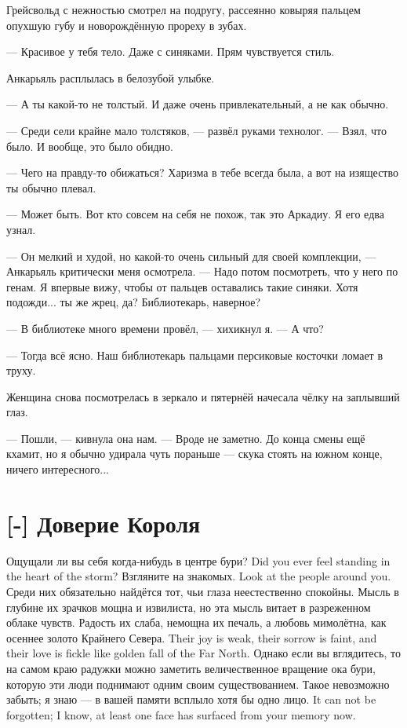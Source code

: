 Грейсвольд с нежностью смотрел на подругу, рассеянно ковыряя пальцем опухшую губу и новорождённую прореху в зубах.

--- Красивое у тебя тело.
Даже с синяками.
Прям чувствуется стиль.

Анкарьяль расплылась в белозубой улыбке.

--- А ты какой-то не толстый.
И даже очень привлекательный, а не как обычно.

--- Среди сели крайне мало толстяков, --- развёл руками технолог.
--- Взял, что было.
И вообще, это было обидно.

--- Чего на правду-то обижаться?
Харизма в тебе всегда была, а вот на изящество ты обычно плевал.

--- Может быть.
Вот кто совсем на себя не похож, так это Аркадиу.
Я его едва узнал.

--- Он мелкий и худой, но какой-то очень сильный для своей комплекции, --- Анкарьяль критически меня осмотрела.
--- Надо потом посмотреть, что у него по генам.
Я впервые вижу, чтобы от пальцев оставались такие синяки.
Хотя подожди... ты же жрец, да?
Библиотекарь, наверное?

--- В библиотеке много времени провёл, --- хихикнул я.
--- А что?

--- Тогда всё ясно.
Наш библиотекарь пальцами персиковые косточки ломает в труху.

Женщина снова посмотрелась в зеркало и пятернёй начесала чёлку на заплывший глаз.

--- Пошли, --- кивнула она нам.
--- Вроде не заметно.
До конца смены ещё кхамит, но я обычно удирала чуть пораньше --- скука стоять на южном конце, ничего интересного...

\section{[-] Доверие Короля}

{Ощущали ли вы себя когда-нибудь в центре бури?}
{Did you ever feel standing in the heart of the storm?}
{Взгляните на знакомых.}
{Look at the people around you.}
Среди них обязательно найдётся тот, чьи глаза неестественно спокойны.
Мысль в глубине их зрачков мощна и извилиста, но эта мысль витает в разреженном облаке чувств.
{Радость их слаба, немощна их печаль, а любовь мимолётна, как осеннее золото Крайнего Севера.}
{Their joy is weak, their sorrow is faint, and their love is fickle like golden fall of the Far North.}
Однако если вы вглядитесь, то на самом краю радужки можно заметить величественное вращение ока бури, которую эти люди поднимают одним своим существованием.
{Такое невозможно забыть; я знаю --- в вашей памяти всплыло хотя бы одно лицо.}
{It can not be forgotten; I know, at least one face has surfaced from your memory now.}

